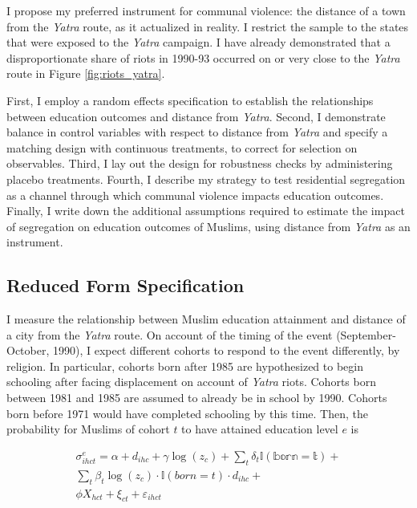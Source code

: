 \documentclass{article}
\begin{document}
I propose my preferred instrument for communal violence: the distance of a town from the \emph{Yatra} route, as it actualized in reality. I restrict the sample to the states that were exposed to the \emph{Yatra} campaign. I have already demonstrated that a disproportionate share of riots in 1990-93 occurred on or very close to the \emph{Yatra} route in Figure \ref{fig:riots_yatra}.

First, I employ a random effects specification to establish the relationships between education outcomes and distance from \textit{Yatra}. Second, I demonstrate balance in control variables with respect to distance from \textit{Yatra} and specify a matching design with continuous treatments, to correct for selection on observables. Third, I lay out the design for robustness checks by administering placebo treatments. Fourth, I describe my strategy to test residential segregation as a channel through which communal violence impacts education outcomes. Finally, I write down the additional assumptions required to estimate the impact of segregation on education outcomes of Muslims, using distance from \textit{Yatra} as an instrument.

\subsection{Reduced Form Specification}\label{reduced_form}
I measure the relationship between Muslim education attainment and distance of a city from the \textit{Yatra} route. On account of the timing of the event (September-October, 1990), I expect different cohorts to respond to the event differently, by religion. In particular, cohorts born after 1985 are hypothesized to begin schooling after facing displacement on account of \textit{Yatra} riots. Cohorts born between 1981 and 1985 are assumed to already be in school by 1990. Cohorts born before 1971 would have completed schooling by this time. Then, the probability for Muslims of cohort $t$ to have attained education level $e$ is 

\begin{equation}
\begin{split}\label{eq:lpm_yatra}
       \sigma_{ihct}^e = \alpha + d_{ihc} + \gamma \log(z_c) + \sum_{t}\delta_{t} \mathbb{I(born = t)} + \\
       \sum_{t} \beta_{t} \log(z_c) \cdot \mathbb{I} (born = t) \cdot d_{ihc}+ \\
       \phi X_{hct} + \xi_{ct} + \varepsilon_{ihct} \\
\end{split}
\end{equation}
\end{document}
